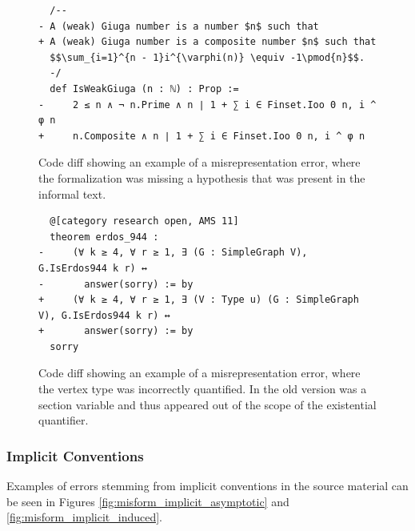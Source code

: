 \begin{figure}[h]
    \centering
    \begin{verbatim}
  /--
- A (weak) Giuga number is a number $n$ such that
+ A (weak) Giuga number is a composite number $n$ such that
  $$\sum_{i=1}^{n - 1}i^{\varphi(n)} \equiv -1\pmod{n}$$.
  -/
  def IsWeakGiuga (n : ℕ) : Prop :=
-     2 ≤ n ∧ ¬ n.Prime ∧ n ∣ 1 + ∑ i ∈ Finset.Ioo 0 n, i ^ φ n
+     n.Composite ∧ n ∣ 1 + ∑ i ∈ Finset.Ioo 0 n, i ^ φ n
    \end{verbatim}
    \caption{Code diff showing an example of a misrepresentation error, where the formalization was missing a hypothesis that was present in the informal text. }
    \label{fig:misform_misrep_giuga}
\end{figure}

\begin{figure}[h]
    \centering
    \begin{verbatim}
  @[category research open, AMS 11]
  theorem erdos_944 :
-     (∀ k ≥ 4, ∀ r ≥ 1, ∃ (G : SimpleGraph V), G.IsErdos944 k r) ↔ 
-       answer(sorry) := by
+     (∀ k ≥ 4, ∀ r ≥ 1, ∃ (V : Type u) (G : SimpleGraph V), G.IsErdos944 k r) ↔ 
+       answer(sorry) := by
  sorry
    \end{verbatim}
    \caption{Code diff showing an example of a misrepresentation error, where the vertex type  was incorrectly quantified. In the old version  was a section variable and thus appeared out of the scope of the existential quantifier.}
    \label{fig:misform_misrep_quantifier}
\end{figure}

\subsubsection{Implicit Conventions}

Examples of errors stemming from implicit conventions in the source material can be seen in Figures \ref{fig:misform_implicit_asymptotic} and \ref{fig:misform_implicit_induced}.

